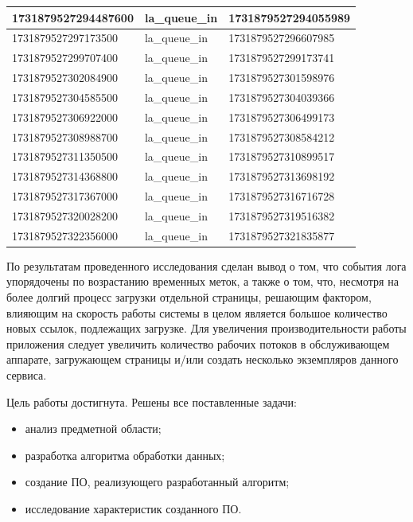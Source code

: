 \begin{longtable}{|p{}|p{}|p{}|}
    1731879527294487600 & la\_queue\_in & 1731879527294055989\\ \hline
    1731879527297173500 & la\_queue\_in & 1731879527296607985\\ \hline
    1731879527299707400 & la\_queue\_in & 1731879527299173741\\ \hline
    1731879527302084900 & la\_queue\_in & 1731879527301598976\\ \hline
    1731879527304585500 & la\_queue\_in & 1731879527304039366\\ \hline
    1731879527306922000 & la\_queue\_in & 1731879527306499173\\ \hline
    1731879527308988700 & la\_queue\_in & 1731879527308584212\\ \hline
    1731879527311350500 & la\_queue\_in & 1731879527310899517\\ \hline
    1731879527314368800 & la\_queue\_in & 1731879527313698192\\ \hline
    1731879527317367000 & la\_queue\_in & 1731879527316716728\\ \hline
    1731879527320028200 & la\_queue\_in & 1731879527319516382\\ \hline
    1731879527322356000 & la\_queue\_in & 1731879527321835877\\ \hline
\end{longtable}

По результатам проведенного исследования сделан вывод о том, что события лога упорядочены по возрастанию временных меток, а также о том, что, несмотря на более долгий процесс загрузки отдельной страницы, решающим фактором, влияющим на скорость работы системы в целом является большое количество новых ссылок, подлежащих загрузке.
Для увеличения производительности работы приложения следует увеличить количество рабочих потоков в обслуживающем аппарате, загружающем страницы и/или создать несколько экземпляров данного сервиса.


Цель работы достигнута. Решены все поставленные задачи: 
\begin{itemize}
    \item анализ предметной области;
    \item разработка алгоритма обработки данных;
    \item создание ПО, реализующего разработанный алгоритм;
    \item исследование характеристик созданного ПО.
\end{itemize}
